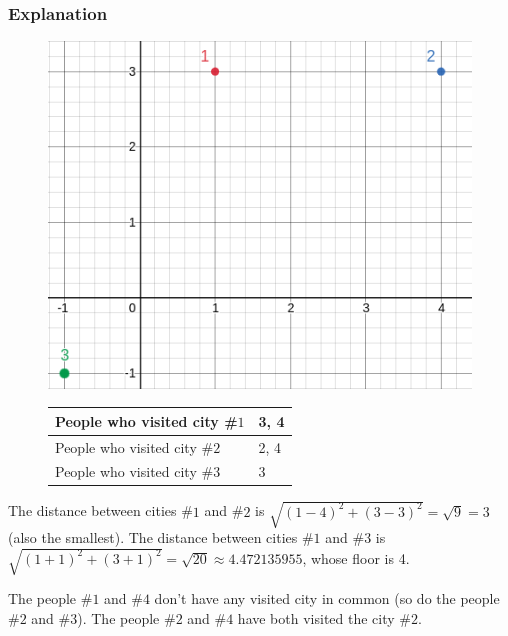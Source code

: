 \documentclass{article}
\begin{document}
\subsubsection*{Explanation}
\begin{figure}[h]
	\centering
	\begin{minipage}{0.45\textwidth}
		\centering
		\includegraphics[scale=0.4]{graf.png}
		\label{fig:fig1}
	\end{minipage}
	\begin{minipage}{0.35\textwidth}
		\centering
		\begin{tabular}{|l|l|}
			\hline
			People who visited city \#$1$ & 3, 4 \\ \hline
			People who visited city \#$2$ & 2, 4 \\ \hline
			People who visited city \#$3$ & 3 \\ \hline
		\end{tabular}
		\label{fig:fig2}
	\end{minipage}
\end{figure}
The distance between cities \#$1$ and \#$2$ is $\sqrt{(1-4)^2 + (3-3)^2} = \sqrt{9} = 3$ (also the smallest).
The distance between cities \#$1$ and \#$3$ is $\sqrt{(1+1)^2 + (3+1)^2} = \sqrt{20} \approx 4.472135955$, whose floor is 4.

The people \#$1$ and \#$4$ don't have any visited city in common (so do the people \#$2$ and \#$3$).
The people \#$2$ and \#$4$ have both visited the city \#$2$.
\end{document}
